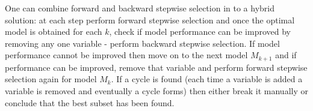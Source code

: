 One can combine forward and backward stepwise selection in to a hybrid solution: at each step perform forward stepwise selection and once the optimal model is obtained for each $k$, check if model performance can be improved by removing any one variable - perform backward stepwise selection. If model performance cannot be improved then move on to the next model $M_{k+1}$ and if performance can be improved, remove that variable and perform forward stepwise selection again for model $M_{k}$. If a cycle is found (each time a variable is added a variable is removed and eventually a cycle forms) then either break it manually or conclude that the best subset has been found.
